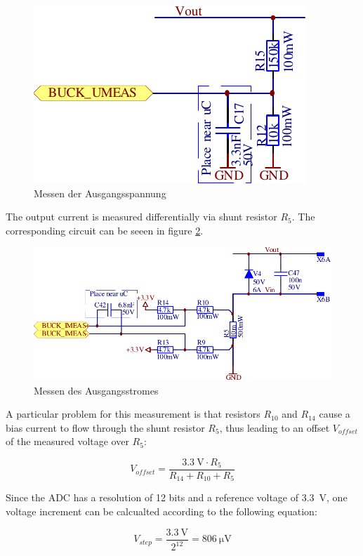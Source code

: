 \begin{figure}[th!]
    \center
    \includegraphics[width=.45\textwidth]{images/circuit/buck-umeas.pdf}
    \caption{Messen der Ausgangsspannung}
    \label{fig:circuit:buck:umeas}
\end{figure}

The output  current is measured  differentially via shunt  resistor $R_5$. The
corresponding circuit can be seeen in figure \ref{fig:circuit:buck:imeas}.

\begin{figure}[th!]
    \center
    \includegraphics[width=.85\textwidth]{images/circuit/buck-imeas.pdf}
    \caption{Messen des Ausgangsstromes}
    \label{fig:circuit:buck:imeas}
\end{figure}

A  particular problem  for this  measurement  is that  resistors $R_{10}$  and
$R_{14}$ cause a  bias current to flow through the  shunt resistor $R_5$, thus
leading to an offset $V_{offset}$ of the measured voltage over $R_5$:

\begin{equation}
    V_{offset} = \frac{ \SI{3.3}{\volt} \cdot R_5 }{ R_{14} + R_{10} + R_5 }
    \label{eq:circuit:buck:shunt_offset}
\end{equation}

Since  the  ADC has  a  resolution  of 12  bits  and  a reference  voltage  of
\SI{3.3}{\volt},  one voltage  increment can  be calcualted  according to  the
following equation:

\begin{equation}
    V_{step} = \frac{\SI{3.3}{\volt}}{2^{12}} = \SI{806}{\micro\volt}
    \label{eq:circuit:buck:adc_step}
\end{equation}

